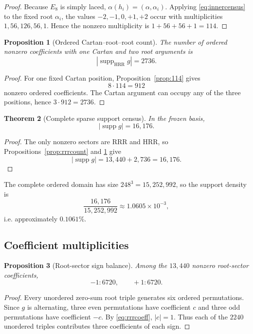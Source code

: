 \documentclass[11pt]{article}
\newtheorem{theorem}{Theorem}[section]
\newtheorem{proposition}[theorem]{Proposition}
\theoremstyle{definition}
\theoremstyle{remark}
\newcommand{\supp}{\operatorname{supp}}
\newcommand{\RRR}{\mathrm{RRR}}
\newcommand{\HRR}{\mathrm{HRR}}
\begin{document}
\begin{proof}
Because $E_8$ is simply laced, $\alpha(h_i)=(\alpha,\alpha_i)$.  Applying \eqref{eq:innercensus} to the fixed root $\alpha_i$, the values $-2,-1,0,+1,+2$ occur with multiplicities $1,56,126,56,1$.  Hence the nonzero multiplicity is $1+56+56+1=114$.
\end{proof}

\begin{proposition}[Ordered Cartan--root--root count]\label{prop:hrrcount}
The number of ordered nonzero coefficients with one Cartan and two root arguments is
\[
|\supp_{\HRR}g|=2736.
\]
\end{proposition}

\begin{proof}
For one fixed Cartan position, Proposition~\ref{prop:114} gives
\[
8\cdot114=912
\]
nonzero ordered coefficients.  The Cartan argument can occupy any of the three positions, hence $3\cdot912=2736$.
\end{proof}

\begin{theorem}[Complete sparse support census]\label{thm:16176}
In the frozen basis,
\[
|\supp g|=16{,}176.
\]
\end{theorem}

\begin{proof}
The only nonzero sectors are $\RRR$ and $\HRR$, so Propositions~\ref{prop:rrrcount} and \ref{prop:hrrcount} give
\[
|\supp g|=13{,}440+2{,}736=16{,}176.
\]
\end{proof}

The complete ordered domain has size $248^3=15{,}252{,}992$, so the support density is
\[
\frac{16{,}176}{15{,}252{,}992}
\approx 1.0605\times10^{-3},
\]
i.e. approximately $0.1061\%$.

\subsection{Coefficient multiplicities}

\begin{proposition}[Root-sector sign balance]\label{prop:rrrsigns}
Among the $13{,}440$ nonzero root-sector coefficients,
\[
-1:6720,
\qquad
+1:6720.
\]
\end{proposition}

\begin{proof}
Every unordered zero-sum root triple generates six ordered permutations.  Since $g$ is alternating, three even permutations have coefficient $c$ and three odd permutations have coefficient $-c$.  By \eqref{eq:rrrcoeff}, $|c|=1$.  Thus each of the $2240$ unordered triples contributes three coefficients of each sign.
\end{proof}
\end{document}
